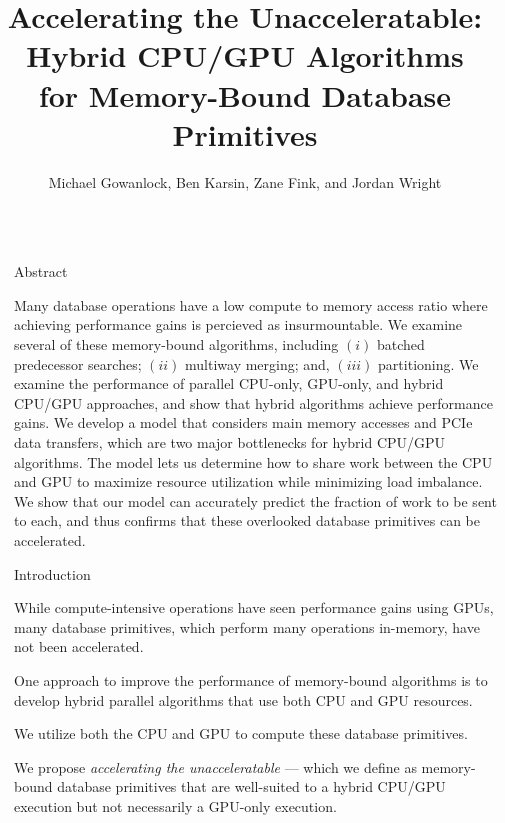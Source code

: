 \documentclass[final]{beamer}
\title{Accelerating the Unacceleratable: Hybrid CPU/GPU Algorithms\\ for Memory-Bound Database Primitives}
\author{Michael Gowanlock\inst{1}, Ben Karsin\inst{2}, Zane Fink\inst{1}, and Jordan Wright\inst{1}}
\institute[shortinst]{\inst{1} School of Informatics, Computing, and Cyber Systems at Northern Arizona University \and %
                      \inst{2} Department of Computer Science at Universite libre de Bruxelles }
\newlength{\sepwidth}
\newlength{\colwidth}
\newcommand{\separatorcolumn}{\begin{column}{\sepwidth}\end{column}}
\begin{document}
\begin{frame}[t]
\begin{columns}[t]
\separatorcolumn

\begin{column}{\colwidth}

  \begin{block}{Abstract}

   Many database operations have a low compute to memory access ratio where achieving performance gains is percieved as insurmountable. We examine several of these memory-bound algorithms, 
   including $(i)$ batched predecessor searches; $(ii)$ multiway merging; and, $(iii)$ partitioning. 
   We examine the performance of parallel CPU-only, GPU-only, and hybrid CPU/GPU approaches, and show 
   that hybrid algorithms achieve performance gains. We develop a model that considers 
   main memory accesses and PCIe data transfers, which are two major bottlenecks for hybrid CPU/GPU algorithms. 
   The model lets us determine how to share work between the CPU and GPU to maximize resource 
   utilization while minimizing load imbalance. We show that our model can accurately predict the fraction of work 
   to be sent to each, and thus confirms that these overlooked database primitives can be 
   accelerated. 

  \end{block}

  \begin{block}{Introduction}
    
\begin{description}[font=$\bullet$~\normalfont\scshape\color{red!50!black}]

\item While compute-intensive operations have seen performance gains using GPUs, many database primitives, which perform many operations in-memory, have not been accelerated. 

\item One approach to improve the performance of memory-bound algorithms is to develop hybrid parallel algorithms that use both CPU and GPU resources.

\item We utilize both the CPU and GPU to compute these database primitives.

\item We propose \emph{accelerating the unacceleratable} --- which we define as memory-bound database primitives that are well-suited to a hybrid CPU/GPU execution but not necessarily a GPU-only execution. 


\end{description}
\end{block}
\end{column}
\end{columns}
\end{frame}
\end{document}
